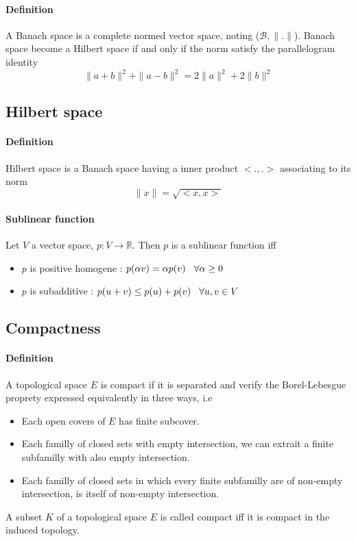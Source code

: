 \documentclass[a4paper,10pt]{article}
\begin{document}
\paragraph{Definition} A Banach space is a complete normed vector space, noting ($\mathcal{B}, \|.\|$). Banach space become a Hilbert space if and only if the norm satisfy the parallelogram identity
\[
\| a+b \|^2  + \| a-b \|^2 = 2\|a\|^2  + 2\|b\|^2 
\]

\subsection{Hilbert space} 
\paragraph{Definition} Hilbert space is a Banach space having a inner product $<.,.>$ associating to its norm
\[
\| x \| = \sqrt{<x,x>}
\]

\paragraph{Sublinear function} Let $V$ a vector space, $p:V\longrightarrow \mathbb{R}$. Then $p$ is a sublinear function iff
\begin{itemize}
 \item $p$ is positive homogene : $p(\alpha v) = \alpha p(v) \hspace{3mm} \forall \alpha \geq 0$
 \item $p$ is subadditive : $p(u+v) \leq p(u)+ p(v) \hspace{3mm} \forall u,v \in V$ 
\end{itemize}

\subsection{Compactness}
\paragraph{Definition} A topological space $E$ is compact if it is separated and verify the Borel-Lebesgue proprety expressed equivalently in three ways, i.e 
\begin{itemize}
\renewcommand{\labelitemi}{$\vcenter{\hbox{\tiny$\bullet$}}$}
 \item Each open covers of $E$ has finite subcover.
 \item Each familly of closed sets with empty intersection, we can extrait a finite subfamilly with also empty intersection.
 \item Each familly of closed sets in which every finite subfamilly are of non-empty intersection, is itself of non-empty intersection.
\end{itemize}
A subset $K$ of a topological space $E$ is called compact iff it is compact in the induced topology.
\end{document}
